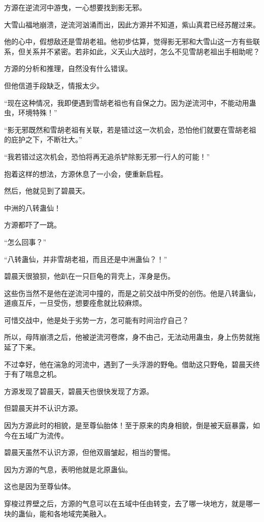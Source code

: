 \begin{this_body}
方源在逆流河中游曳，一心想要找到影无邪。

大雪山福地崩溃，逆流河汹涌而出，因此方源并不知道，紫山真君已经苏醒过来。

他的心中，假想敌还是雪胡老祖。他初步估算，觉得影无邪和大雪山这一方有些联系，但关系并不紧密。若非如此，义天山大战时，怎么不见雪胡老祖出手相助呢？

方源的分析和推理，自然没有什么错误。

但他信道手段缺乏，情报太少。

“现在这种情况，我即便遇到雪胡老祖也有自保之力。因为逆流河中，不能动用蛊虫，环境特殊！”

“影无邪既然和雪胡老祖有关联，若是错过这一次机会，恐怕他们就要在雪胡老祖的庇护之下，不断壮大。”

“我若错过这次机会，恐怕将再无追杀铲除影无邪一行人的可能！”

抱着这样的想法，方源休息了一小会，便重新启程。

然后，他就见到了碧晨天。

中洲的八转蛊仙！

方源都吓了一跳。

“怎么回事？”

“八转蛊仙，并非雪胡老祖，而且还是中洲蛊仙？！”

碧晨天很狼狈，他趴在一只巨龟的背壳上，浑身是伤。

这些伤当然不是他在逆流河中撞的，而是之前交战中所受的创伤。他是八转蛊仙，道痕互斥，一旦受伤，想要痊愈就比较麻烦。

可惜交战中，他是处于劣势一方，怎可能有时间治疗自己？

所以，母阵崩溃之后，他被逆流河卷席，身不由己，无法动用蛊虫，身上伤势就拖延了下来。

不过幸好，他在湍急的河流中，遇到了一头浮游的野龟。借助这只野龟，碧晨天终于有了喘息之机。

方源发现了碧晨天，碧晨天也很快发现了方源。

但碧晨天并不认识方源。

因为方源此时的相貌，是至尊仙胎体！至于原来的肉身相貌，倒是被天庭暴露，如今在五域广为流传。

碧晨天虽然不认识方源，但他双眉皱起，相当的警惕。

因为方源的气息，表明他就是北原蛊仙。

这也是因为至尊仙体。

穿梭过界壁之后，方源的气息可以在五域中任由转变，去了哪一块地方，就是哪一块的蛊仙，能和各地域完美融入。


\end{this_body}
